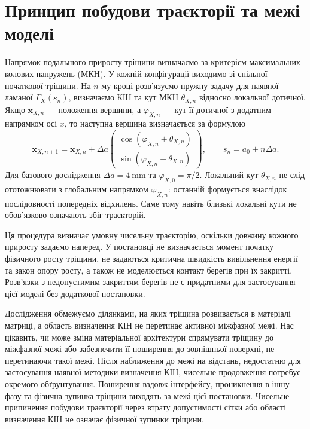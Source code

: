 \section{Принцип побудови траєкторії та межі моделі}
\label{sec:problem-path}
Напрямок подальшого приросту тріщини визначаємо за критерієм максимальних колових напружень (МКН). У кожній конфігурації виходимо зі спільної початкової тріщини. На $n$-му кроці розв'язуємо пружну задачу для наявної ламаної $\Gamma_X(s_n)$, визначаємо КІН та кут МКН $\theta_{X,n}$ відносно локальної дотичної. Якщо $\boldsymbol x_{X,n}$ --- положення вершини, а $\varphi_{X,n}$ --- кут її дотичної з додатним напрямком осі $x$, то наступна вершина визначається за формулою
\begin{equation}
 \boldsymbol x_{X,n+1}=\boldsymbol x_{X,n}
 +\Delta a
 \begin{pmatrix}
 \cos(\varphi_{X,n}+\theta_{X,n})\\
 \sin(\varphi_{X,n}+\theta_{X,n})
 \end{pmatrix},
 \qquad
 s_n=a_0+n\Delta a .
 \label{eq:problem-step}
\end{equation}
Для базового дослідження $\Delta a=\qty{4}{\milli\metre}$ та $\varphi_{X,0}=\pi/2$. Локальний кут $\theta_{X,n}$ не слід ототожнювати з глобальним напрямком $\varphi_{X,n}$: останній формується внаслідок послідовності попередніх відхилень. Саме тому навіть близькі локальні кути не обов'язково означають збіг траєкторій.

Ця процедура визначає умовну чисельну траєкторію, оскільки довжину кожного приросту задаємо наперед. У постановці не визначається момент початку фізичного росту тріщини, не задаються критична швидкість вивільнення енергії та закон опору росту, а також не моделюється контакт берегів при їх закритті. Розв'язки з недопустимим закриттям берегів не є придатними для застосування цієї моделі без додаткової постановки.

Дослідження обмежуємо ділянками, на яких тріщина розвивається в матеріалі матриці, а область визначення КІН не перетинає активної міжфазної межі. Нас цікавить, чи може зміна матеріальної архітектури спрямувати тріщину до міжфазної межі або забезпечити її поширення до зовнішньої поверхні, не перетинаючи такої межі. Після наближення до межі на відстань, недостатню для застосування наявної методики визначення КІН, чисельне продовження потребує окремого обґрунтування. Поширення вздовж інтерфейсу, проникнення в іншу фазу та фізична зупинка тріщини виходять за межі цієї постановки. Чисельне припинення побудови траєкторії через втрату допустимості сітки або області визначення КІН не означає фізичної зупинки тріщини.

